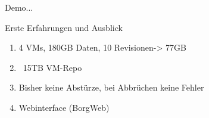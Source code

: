 \documentclass{beamer}
\begin{document}
\begin{frame}{Demo...}
\end{frame}

\begin{frame}{Erste Erfahrungen und Ausblick}
  \begin{enumerate}[*]
    \item 4 VMs, 180GB Daten, 10 Revisionen\pause -> 77GB\pause
    \item ~15TB VM-Repo\pause
    \item Bisher keine Abstürze, bei Abbrüchen keine Fehler\pause
    \item Webinterface (BorgWeb)
  \end{enumerate}
\end{frame}
\end{document}
